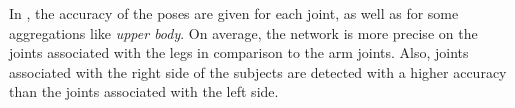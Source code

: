 In , the accuracy of the poses are given for each joint, as well as for some aggregations like \textit{upper body}.
On average, the network is more precise on the joints associated with the legs in comparison to the arm joints.
Also, joints associated with the right side of the subjects are detected with a higher accuracy than the joints associated with the left side.

